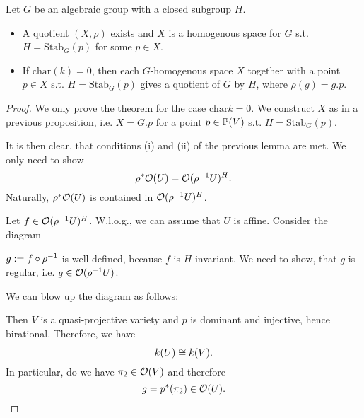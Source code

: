 \begin{theorem}
	Let $G$ be an algebraic group with a closed subgroup $H$.
	\begin{itemize}
		\item A quotient $(X, \rho)$ exists and $X$ is a homogenous space for $G$ s.t. $H = \mathrm{Stab}_G(p)$ for some $p \in X$.
		\item If $\mathrm{char}(k)= 0$, then each $G$-homogenous space $X$ together with a point $p\in X$ s.t. $H = \mathrm{Stab}_G(p)$ gives a quotient of $G$ by $H$, where $\rho(g) = g.p$.
	\end{itemize}
\end{theorem}
\begin{proof}
	We only prove the theorem for the case $\mathrm{char} k = 0$. We construct $X$ as in a previous proposition, i.e. $X = G.p$ for a point $p \in \P(V)$ s.t. $H = \mathrm{Stab}_G(p)$.
	
	It is then clear, that conditions (i) and (ii) of the previous lemma are met. We only need to show
	\[ \rho^*\O(U) = \O(\rho\i U)^H. \]
	Naturally, $\rho^*\O(U)$ is contained in $\O(\rho\i U)^H$.
	
	Let $f \in \O(\rho\i U)^H$. W.l.o.g., we can assume that $U$ is affine. Consider the diagram
	\begin{center}
	\end{center}
$g := f \circ \rho\i$ is well-defined, because $f$ is $H$-invariant. We need to show, that $g$ is regular, i.e. $g \in \O(\rho\i U)$.

We can blow up the diagram as follows:
	\begin{center}
\end{center}
Then $V$ is a quasi-projective variety and $p$ is dominant and injective, hence birational. Therefore, we have
\[ k(U) \isom{} k(V). \]
In particular, do we have $\pi_2 \in \O(V)$ and therefore
\[ g = p^*(\pi_2) \in \O(U). \]
\end{proof}

